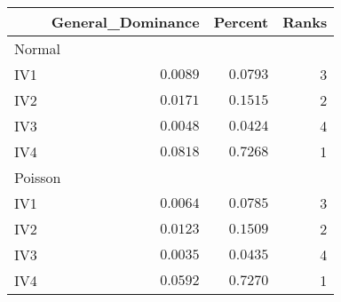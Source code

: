 \begin{longtable}{l|rrr}
\toprule
\multicolumn{1}{l}{} & General\_Dominance & Percent & Ranks \\ 
\midrule
\multicolumn{4}{l}{Normal} \\ 
\midrule
IV1 & $0.0089$ & $0.0793$ & 3 \\ 
IV2 & $0.0171$ & $0.1515$ & 2 \\ 
IV3 & $0.0048$ & $0.0424$ & 4 \\ 
IV4 & $0.0818$ & $0.7268$ & 1 \\ 
\midrule
\multicolumn{4}{l}{Poisson} \\ 
\midrule
IV1 & $0.0064$ & $0.0785$ & 3 \\ 
IV2 & $0.0123$ & $0.1509$ & 2 \\ 
IV3 & $0.0035$ & $0.0435$ & 4 \\ 
IV4 & $0.0592$ & $0.7270$ & 1 \\ 
\bottomrule
\end{longtable}

